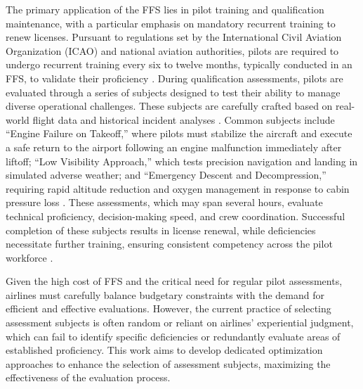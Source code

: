\documentclass[opre,sglanonrev]{informs4}
\begin{document}
The primary application of the FFS lies in pilot training and qualification maintenance, with a particular emphasis on mandatory recurrent training to renew licenses. Pursuant to regulations set by the International Civil Aviation Organization (ICAO) and national aviation authorities, pilots are required to undergo recurrent training every six to twelve months, typically conducted in an FFS, to validate their proficiency \citep{Flightradar2024}. During qualification assessments, pilots are evaluated through a series of subjects designed to test their ability to manage diverse operational challenges. These subjects are carefully crafted based on real-world flight data and historical incident analyses %
\citep{NTSB2012}. Common subjects include ``Engine Failure on Takeoff,'' where pilots must stabilize the aircraft and execute a safe return to the airport following an engine malfunction immediately after liftoff; ``Low Visibility Approach,'' which tests precision navigation and landing in simulated adverse weather; and ``Emergency Descent and Decompression,'' requiring rapid altitude reduction and oxygen management in response to cabin pressure loss \citep{PilotWorkshops2023}. These assessments, which may span several hours, evaluate technical proficiency, decision-making speed, and crew coordination. Successful completion of these subjects results in license renewal, while deficiencies necessitate further training, ensuring consistent competency across the pilot workforce \citep{EASA2020}.

Given the high cost of FFS and the critical need for regular pilot assessments, airlines must carefully balance budgetary constraints with the demand for efficient and effective evaluations. However, the current practice of selecting assessment subjects is often random or reliant on airlines' experiential judgment, which can fail to identify specific deficiencies or redundantly evaluate areas of established proficiency. This work aims to develop dedicated optimization approaches to enhance the selection of assessment subjects, maximizing the effectiveness of the evaluation process.
\end{document}
